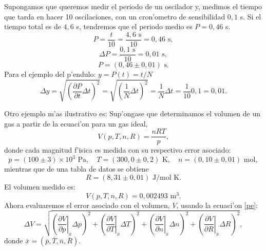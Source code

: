 \documentclass[a4paper]{report}
\begin{document}
Supongamos que queremos medir el periodo de un oscilador y, medimos el tiempo que tarda en hacer 10 oscilaciones, con un cron'ometro de sensibilidad $0,1$ s. Si el tiempo total es de $4,6$ s, tendremos que el periodo medio es $P = 0,46$ s.
\begin{equation}
P = \frac{t}{10}=\frac{4,6\text{ s}}{10}=0,46\text{ s},
\end{equation}
\begin{equation}
\Delta P = \frac{0,1\text{ s}}{10}=0,01\text{ s},
\end{equation}
\begin{equation}
P=(0,46\pm 0,01)\text{ s}.
\end{equation}
Para el ejemplo del p'endulo: $y=P(t)=t/N$
\begin{equation}
\Delta y=\sqrt{\left(\frac{\partial P}{\partial t}\Delta t\right)^2}=\sqrt{\left(\frac{1}{N}\Delta t\right)^2}=\frac{1}{N}\Delta t=\frac{1}{10}0,1=0,01.
\end{equation}

Otro ejemplo m'as ilustrativo es: Sup'ongase que determinamos el volumen de un gas a partir de la ecuaci'on para un gas ideal,
\begin{equation}
V(p,T,n,R)=\frac{nRT}{p},
\end{equation}
donde cada magnitud f'isica es medida con su respectivo error asociado:
\begin{equation}
p=(100\pm 3)\times 10^3\text{ Pa}, \quad T=(300,0\pm 0,2)\text{ K}, 
\quad n=(0,10\pm 0,01)\text{ mol},
\end{equation}
mientras que de una tabla de datos se obtiene
\begin{equation}
R=(8,31\pm 0,01)\text{ J/mol K}.
\end{equation}
El volumen medido es:
\begin{equation}
V(p,T,n,R)=0,002493\text{ m}^3.
\end{equation}
Ahora evaluaremos el error asociado con el volumen, $V$, usando la ecuaci'on \eqref{pe}:
\begin{equation}
\Delta V=\sqrt{\left(\left.\frac{\partial V}{\partial p}\right|_{\overline{x}}\Delta p\right)^2+
\left(\left.\frac{\partial V}{\partial T}\right|_{\overline{x}}\Delta T\right)^2+\left(\left.\frac{\partial V}{\partial n}\right|_{\overline{x}}\Delta n\right)^2+\left(\left.\frac{\partial V}{\partial R}\right|_{\overline{x}}\Delta R\right)^2},
\end{equation}
donde $\overline{x}=(\overline{p},\overline{T},\overline{n},\overline{R})$.
\end{document}
